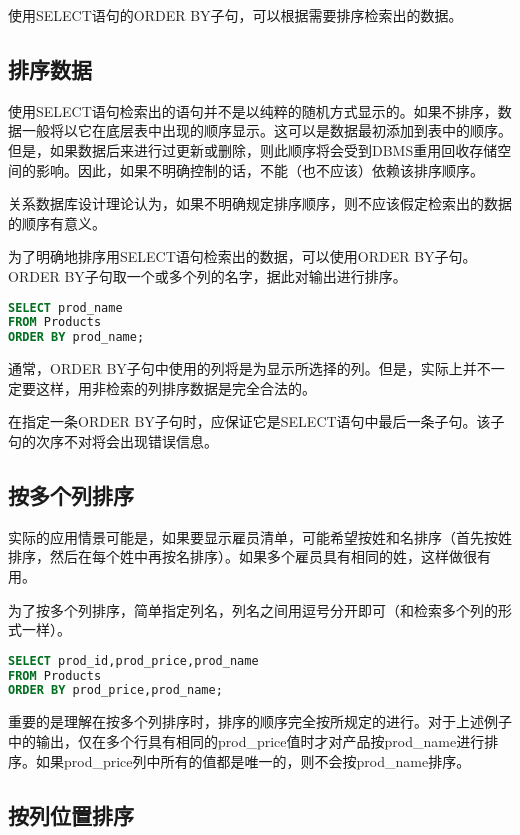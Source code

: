使用SELECT语句的ORDER BY子句，可以根据需要排序检索出的数据。
\subsection{排序数据}

使用SELECT语句检索出的语句并不是以纯粹的随机方式显示的。如果不排序，数据一般将以它在底层表中出现的顺序显示。这可以是数据最初添加到表中的顺序。但是，如果数据后来进行过更新或删除，则此顺序将会受到DBMS重用回收存储空间的影响。因此，如果不明确控制的话，不能（也不应该）依赖该排序顺序。

关系数据库设计理论认为，如果不明确规定排序顺序，则不应该假定检索出的数据的顺序有意义。

为了明确地排序用SELECT语句检索出的数据，可以使用ORDER BY子句。ORDER BY子句取一个或多个列的名字，据此对输出进行排序。

\begin{lstlisting}[language=SQL]
SELECT prod_name
FROM Products
ORDER BY prod_name;
\end{lstlisting}

通常，ORDER BY子句中使用的列将是为显示所选择的列。但是，实际上并不一定要这样，用非检索的列排序数据是完全合法的。

在指定一条ORDER BY子句时，应保证它是SELECT语句中最后一条子句。该子句的次序不对将会出现错误信息。
\subsection{按多个列排序}

实际的应用情景可能是，如果要显示雇员清单，可能希望按姓和名排序（首先按姓排序，然后在每个姓中再按名排序）。如果多个雇员具有相同的姓，这样做很有用。

为了按多个列排序，简单指定列名，列名之间用逗号分开即可（和检索多个列的形式一样）。


\begin{lstlisting}[language=SQL]
SELECT prod_id,prod_price,prod_name
FROM Products
ORDER BY prod_price,prod_name;
\end{lstlisting}

重要的是理解在按多个列排序时，排序的顺序完全按所规定的进行。对于上述例子中的输出，仅在多个行具有相同的prod\_price值时才对产品按prod\_name进行排序。如果prod\_price列中所有的值都是唯一的，则不会按prod\_name排序。

\subsection{按列位置排序}



